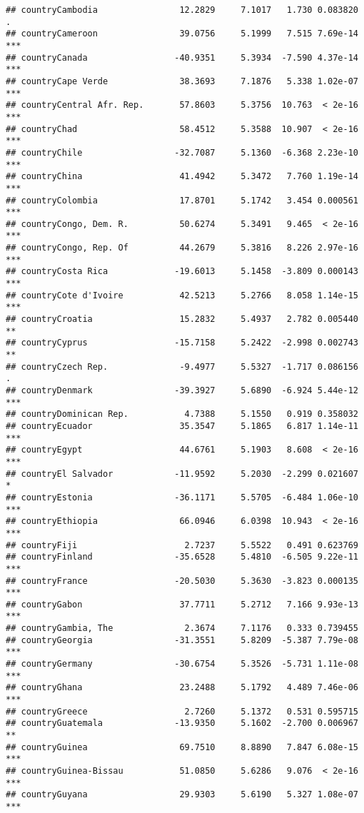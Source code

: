 \documentclass[
  11pt,
]{article}
\begin{document}
\begin{verbatim}
## countryCambodia                12.2829     7.1017   1.730 0.083820 .  
## countryCameroon                39.0756     5.1999   7.515 7.69e-14 ***
## countryCanada                 -40.9351     5.3934  -7.590 4.37e-14 ***
## countryCape Verde              38.3693     7.1876   5.338 1.02e-07 ***
## countryCentral Afr. Rep.       57.8603     5.3756  10.763  < 2e-16 ***
## countryChad                    58.4512     5.3588  10.907  < 2e-16 ***
## countryChile                  -32.7087     5.1360  -6.368 2.23e-10 ***
## countryChina                   41.4942     5.3472   7.760 1.19e-14 ***
## countryColombia                17.8701     5.1742   3.454 0.000561 ***
## countryCongo, Dem. R.          50.6274     5.3491   9.465  < 2e-16 ***
## countryCongo, Rep. Of          44.2679     5.3816   8.226 2.97e-16 ***
## countryCosta Rica             -19.6013     5.1458  -3.809 0.000143 ***
## countryCote d'Ivoire           42.5213     5.2766   8.058 1.14e-15 ***
## countryCroatia                 15.2832     5.4937   2.782 0.005440 ** 
## countryCyprus                 -15.7158     5.2422  -2.998 0.002743 ** 
## countryCzech Rep.              -9.4977     5.5327  -1.717 0.086156 .  
## countryDenmark                -39.3927     5.6890  -6.924 5.44e-12 ***
## countryDominican Rep.           4.7388     5.1550   0.919 0.358032    
## countryEcuador                 35.3547     5.1865   6.817 1.14e-11 ***
## countryEgypt                   44.6761     5.1903   8.608  < 2e-16 ***
## countryEl Salvador            -11.9592     5.2030  -2.299 0.021607 *  
## countryEstonia                -36.1171     5.5705  -6.484 1.06e-10 ***
## countryEthiopia                66.0946     6.0398  10.943  < 2e-16 ***
## countryFiji                     2.7237     5.5522   0.491 0.623769    
## countryFinland                -35.6528     5.4810  -6.505 9.22e-11 ***
## countryFrance                 -20.5030     5.3630  -3.823 0.000135 ***
## countryGabon                   37.7711     5.2712   7.166 9.93e-13 ***
## countryGambia, The              2.3674     7.1176   0.333 0.739455    
## countryGeorgia                -31.3551     5.8209  -5.387 7.79e-08 ***
## countryGermany                -30.6754     5.3526  -5.731 1.11e-08 ***
## countryGhana                   23.2488     5.1792   4.489 7.46e-06 ***
## countryGreece                   2.7260     5.1372   0.531 0.595715    
## countryGuatemala              -13.9350     5.1602  -2.700 0.006967 ** 
## countryGuinea                  69.7510     8.8890   7.847 6.08e-15 ***
## countryGuinea-Bissau           51.0850     5.6286   9.076  < 2e-16 ***
## countryGuyana                  29.9303     5.6190   5.327 1.08e-07 ***

\end{verbatim}
\end{document}

